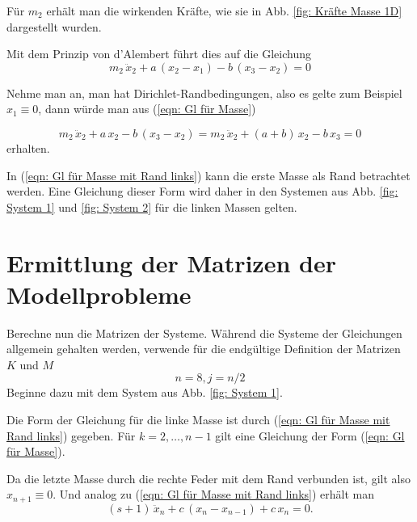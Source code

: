 \documentclass[a4paper,12pt]{report}
\newcommand{\1}{\mathds{1}}
\theoremstyle{plain} %
\theoremstyle{definition} %
\theoremstyle{remark}
\begin{document}
            Für $m_2$ erhält man die wirkenden Kräfte, wie sie in Abb. \ref{fig: Kräfte Masse 1D} dargestellt wurden.

            Mit dem Prinzip von d'Alembert führt dies auf die Gleichung
            \begin{equation}
                  \label{eqn: Gl für Masse}
                  m_2\,\ddot x_2 + a\,(x_2-x_1) - b\,(x_3-x_2) = 0
            \end{equation}

            Nehme man an, man hat Dirichlet-Randbedingungen, also es gelte zum Beispiel $x_1 \equiv 0$, dann würde man aus (\ref{eqn: Gl für Masse})

            \begin{equation}
                  \label{eqn: Gl für Masse mit Rand links}
                  m_2\,\ddot x_2 + a\,x_2 - b\,(x_3-x_2) = m_2\,\ddot x_2 + (a+b)\,x_2 -b\,x_3 = 0
            \end{equation}
            erhalten.

            In (\ref{eqn: Gl für Masse mit Rand links}) kann die erste Masse als Rand betrachtet werden.
            Eine Gleichung dieser Form wird daher in den Systemen aus Abb. \ref{fig: System 1} und \ref{fig: System 2} für die linken Massen gelten.

      \section{Ermittlung der Matrizen der Modellprobleme}
            Berechne nun die Matrizen der Systeme.
            Während die Systeme der Gleichungen allgemein gehalten werden, verwende für die endgültige Definition der Matrizen $K$ und $M$
            \begin{equation}
                  \label{def: nUndJ explizit}
                  n=8, j=n/2
            \end{equation}
            Beginne dazu mit dem System aus Abb. \ref{fig: System 1}.

            Die Form der Gleichung für die linke Masse ist durch (\ref{eqn: Gl für Masse mit Rand links}) gegeben.
            Für $k=2,\dots, n-1$ gilt eine Gleichung der Form (\ref{eqn: Gl für Masse}).
            
            Da die letzte Masse durch die rechte Feder mit dem Rand verbunden ist, gilt also $x_{n+1} \equiv 0$.
            Und analog zu (\ref{eqn: Gl für Masse mit Rand links}) erhält man
            $$(s+1)\,\ddot x_n + c\,(x_n-x_{n-1}) + c\,x_n = 0.$$  
\end{document}
